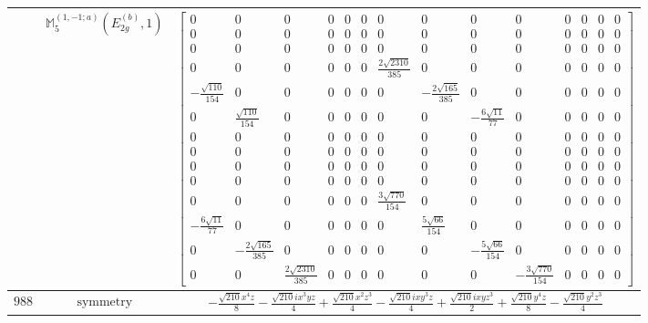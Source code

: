 \documentclass[fleqn,8pt,landscape]{jsarticle}
\begin{document}
\begin{longtable}{ccc}
$  $ & $ \mathbb{M}_{5}^{(1,-1;a)}(E_{2g}^{(b)},1) $ & $ \begin{bmatrix} 0 & 0 & 0 & 0 & 0 & 0 & 0 & 0 & 0 & 0 & 0 & 0 & 0 & 0 \\ 0 & 0 & 0 & 0 & 0 & 0 & 0 & 0 & 0 & 0 & 0 & 0 & 0 & 0 \\ 0 & 0 & 0 & 0 & 0 & 0 & 0 & 0 & 0 & 0 & 0 & 0 & 0 & 0 \\ 0 & 0 & 0 & 0 & 0 & 0 & \frac{2 \sqrt{2310}}{385} & 0 & 0 & 0 & 0 & 0 & 0 & 0 \\ - \frac{\sqrt{110}}{154} & 0 & 0 & 0 & 0 & 0 & 0 & - \frac{2 \sqrt{165}}{385} & 0 & 0 & 0 & 0 & 0 & 0 \\ 0 & \frac{\sqrt{110}}{154} & 0 & 0 & 0 & 0 & 0 & 0 & - \frac{6 \sqrt{11}}{77} & 0 & 0 & 0 & 0 & 0 \\ 0 & 0 & 0 & 0 & 0 & 0 & 0 & 0 & 0 & 0 & 0 & 0 & 0 & 0 \\ 0 & 0 & 0 & 0 & 0 & 0 & 0 & 0 & 0 & 0 & 0 & 0 & 0 & 0 \\ 0 & 0 & 0 & 0 & 0 & 0 & 0 & 0 & 0 & 0 & 0 & 0 & 0 & 0 \\ 0 & 0 & 0 & 0 & 0 & 0 & 0 & 0 & 0 & 0 & 0 & 0 & 0 & 0 \\ 0 & 0 & 0 & 0 & 0 & 0 & \frac{3 \sqrt{770}}{154} & 0 & 0 & 0 & 0 & 0 & 0 & 0 \\ - \frac{6 \sqrt{11}}{77} & 0 & 0 & 0 & 0 & 0 & 0 & \frac{5 \sqrt{66}}{154} & 0 & 0 & 0 & 0 & 0 & 0 \\ 0 & - \frac{2 \sqrt{165}}{385} & 0 & 0 & 0 & 0 & 0 & 0 & - \frac{5 \sqrt{66}}{154} & 0 & 0 & 0 & 0 & 0 \\ 0 & 0 & \frac{2 \sqrt{2310}}{385} & 0 & 0 & 0 & 0 & 0 & 0 & - \frac{3 \sqrt{770}}{154} & 0 & 0 & 0 & 0 \end{bmatrix} $ \\ \hline
$ 988 $ & $ \text{symmetry} $ & $ - \frac{\sqrt{210} x^{4} z}{8} - \frac{\sqrt{210} i x^{3} y z}{4} + \frac{\sqrt{210} x^{2} z^{3}}{4} - \frac{\sqrt{210} i x y^{3} z}{4} + \frac{\sqrt{210} i x y z^{3}}{2} + \frac{\sqrt{210} y^{4} z}{8} - \frac{\sqrt{210} y^{2} z^{3}}{4} $ \\

\end{longtable}
\end{document}

